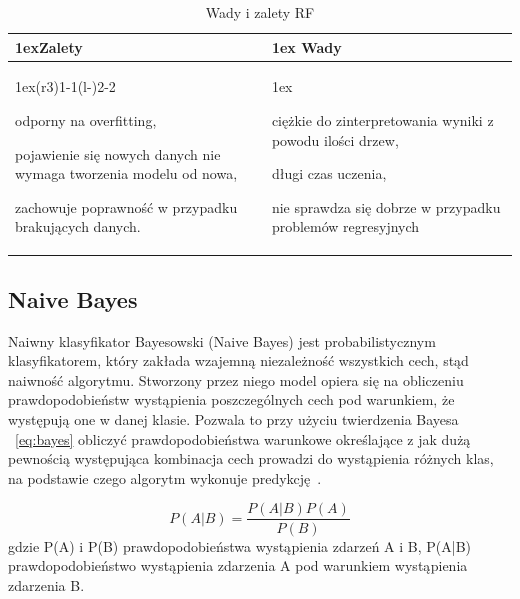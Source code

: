 \begin{table}[H]
    \begin{tabularx}{\linewidth}{>{\parskip1ex}X@{\kern4\tabcolsep}>{\parskip1ex}X}
    \toprule
    \hfil\bfseries Zalety
    &
    \hfil\bfseries Wady
    \\\cmidrule(r{3\tabcolsep}){1-1}\cmidrule(l{-\tabcolsep}){2-2}
    
    odporny na overfitting,\par
    pojawienie się nowych danych nie wymaga tworzenia modelu od nowa,\par
    zachowuje poprawność w przypadku brakujących danych.\par
    
    &
    
    ciężkie do zinterpretowania wyniki z powodu ilości drzew,\par
    długi czas uczenia,\par
    nie sprawdza się dobrze w przypadku problemów regresyjnych\par
    
    \\\bottomrule
    \end{tabularx}
    \caption{Wady i zalety RF}
\end{table}

\subsection{Naive Bayes}

Naiwny klasyfikator Bayesowski (Naive Bayes) jest probabilistycznym klasyfikatorem, który
zakłada wzajemną niezależność wszystkich cech, stąd naiwność algorytmu. Stworzony przez niego model
opiera się na obliczeniu prawdopodobieństw wystąpienia poszczególnych cech pod warunkiem, że 
występują one w danej klasie. Pozwala to przy użyciu twierdzenia Bayesa ~\ref{eq:bayes} obliczyć prawdopodobieństwa 
warunkowe określające z jak dużą pewnością występująca kombinacja cech prowadzi do 
wystąpienia różnych klas, na podstawie czego algorytm wykonuje predykcję~\cite{MLAlgorithms}. 


\begin{equation}
    \label{eq:bayes}
    P(A|B) = \frac{P(A|B)P(A)}{P(B)}
\end{equation}
gdzie P(A) i P(B) prawdopodobieństwa wystąpienia zdarzeń A i B, P(A|B) prawdopodobieństwo wystąpienia
zdarzenia A pod warunkiem wystąpienia zdarzenia B.

